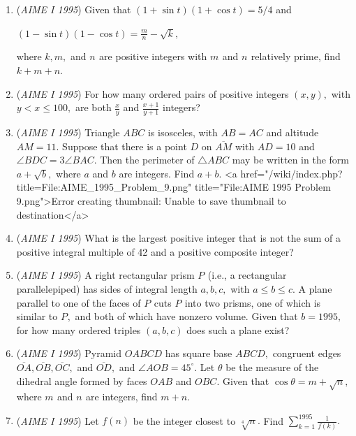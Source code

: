 \begin{enumerate}
 

	\item (\textit{AIME I 1995}) Given that $(1+\sin t)(1+\cos t)=5/4$ and


 $(1-\sin t)(1-\cos t)=\frac mn-\sqrt{k},$

 where $k, m,$ and $n_{}$ are positive integers with $m_{}$ and $n_{}$ relatively prime, find $k+m+n.$


	\item (\textit{AIME I 1995}) For how many ordered pairs of positive integers $(x,y),$ with $y<x\le 100,$ are both $\frac xy$ and $\frac{x+1}{y+1}$ integers?


 

	\item (\textit{AIME I 1995}) Triangle $ABC$ is isosceles, with $AB=AC$ and altitude $AM=11.$  Suppose that there is a point $D$ on $\overline{AM}$ with $AD=10$ and $\angle BDC=3\angle BAC.$  Then the perimeter of $\triangle ABC$ may be written in the form $a+\sqrt{b},$ where $a$ and $b$ are integers.  Find $a+b.$
<a href="/wiki/index.php?title=File:AIME\_1995\_Problem\_9.png" title="File:AIME 1995 Problem 9.png">Error creating thumbnail: Unable to save thumbnail to destination</a>


	\item (\textit{AIME I 1995}) What is the largest positive integer that is not the sum of a positive integral multiple of 42 and a positive composite integer?


 

	\item (\textit{AIME I 1995}) A right rectangular prism $P_{}$ (i.e., a rectangular parallelepiped) has sides of integral length $a, b, c,$ with $a\le b\le c.$  A plane parallel to one of the faces of $P_{}$ cuts $P_{}$ into two prisms, one of which is similar to $P_{},$ and both of which have nonzero volume.  Given that $b=1995,$ for how many ordered triples $(a, b, c)$ does such a plane exist?


 

	\item (\textit{AIME I 1995}) Pyramid $OABCD$ has square base $ABCD,$ congruent edges $\overline{OA}, \overline{OB}, \overline{OC},$ and $\overline{OD},$ and $\angle AOB=45^\circ.$  Let $\theta$ be the measure of the dihedral angle formed by faces $OAB$ and $OBC.$  Given that $\cos \theta=m+\sqrt{n},$ where $m_{}$ and $n_{}$ are integers, find $m+n.$


	\item (\textit{AIME I 1995}) Let $f(n)$ be the integer closest to $\sqrt[4]{n}.$  Find $\sum_{k=1}^{1995}\frac 1{f(k)}.$



\end{enumerate}
